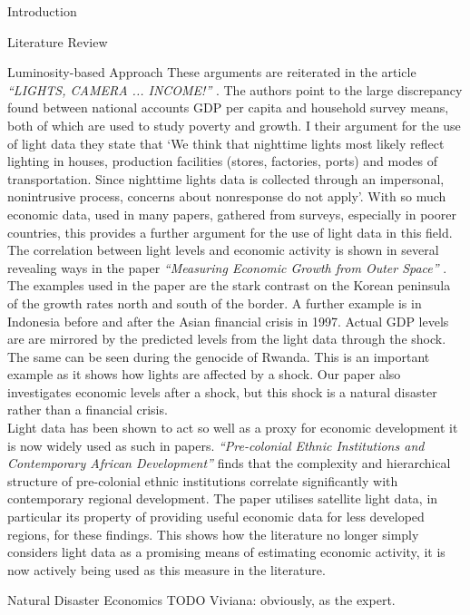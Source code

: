 \documentclass[12pt,fleqn,leqno,letterpaper]{article}
\begin{document}
\begin{section}{Introduction}
\begin{subsection}{Literature Review}
\begin{subsubsection}{Luminosity-based Approach}
      These arguments are reiterated in the article \textit{``LIGHTS, CAMERA ... INCOME!''}  \cite{lightcamera}. The authors point to the large discrepancy found between national accounts GDP per capita and household survey means, both of which are used to study poverty and growth. I their argument for the use of light data they state that `We think that nighttime lights most likely reflect lighting in houses, production facilities (stores, factories, ports) and modes of transportation. Since nighttime lights data is collected through an impersonal, nonintrusive process, concerns about nonresponse do not apply'. With so much economic data, used in many papers, gathered from surveys, especially in poorer countries, this provides a further argument for the use of light data in this field. \\ 
      The correlation between light levels and economic activity is shown in several revealing ways in the paper \textit{``Measuring Economic Growth from Outer Space''} \cite{growthlights}. The examples used in the paper are the stark contrast on the Korean peninsula of the growth rates north and south of the border. A further example is in Indonesia before and after the Asian financial crisis in 1997. Actual GDP levels are are mirrored by the predicted levels from the light data through the shock. The same can be seen during the genocide of Rwanda. This is an important example as it shows how lights are affected by a shock. Our paper also investigates economic levels after a shock, but this shock is a natural disaster rather than a financial crisis. \\
      Light data has been shown to act so well as a proxy for economic development it is now widely used as such in papers. \textit{``Pre-colonial Ethnic Institutions and Contemporary African Development''} \cite{africalights} finds that the complexity and hierarchical structure of pre-colonial ethnic institutions correlate significantly with contemporary regional development. The paper utilises satellite light data, in particular its property of providing useful economic data for less developed regions, for these findings. This shows how the literature no longer simply considers light data as a promising means of estimating economic activity, it is now actively being used as this measure in the literature. 
    \end{subsubsection}
    \begin{subsubsection}{Natural Disaster Economics}
      TODO Viviana: obviously, as the expert.
    \end{subsubsection}
  \end{subsection}
\end{section}
\end{document}

